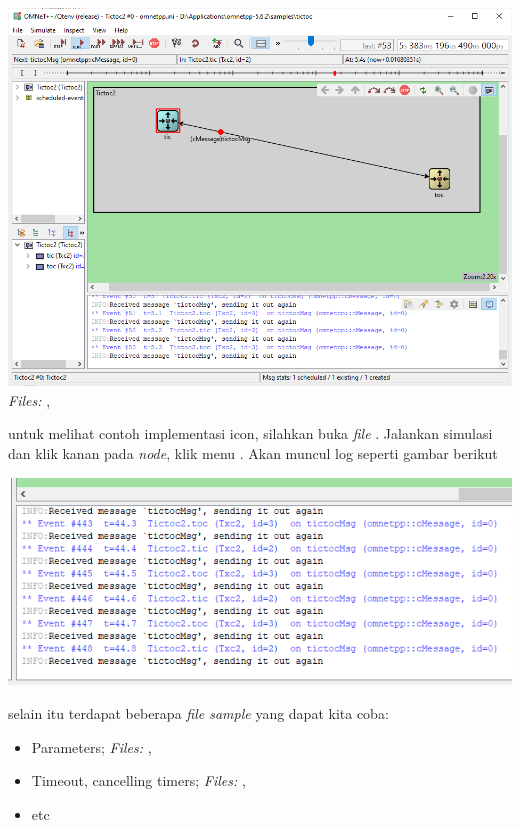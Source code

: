 \documentclass[conference]{IEEEtran}
\begin{document}
\includegraphics[scale=0.25]{images/tictoc2.ned.png}
\textit{Files:} , 


untuk melihat contoh implementasi icon, silahkan buka \textit{file} . Jalankan simulasi dan klik kanan pada \textit{node}, klik menu . Akan muncul log seperti gambar berikut

\includegraphics[scale=0.38]{images/tictoc3-log.ned.png}


selain itu terdapat beberapa \textit{file sample} yang dapat kita coba:
\begin{itemize}
  \item Parameters; \textit{Files: }, 
  \item Timeout, cancelling timers; \textit{Files: }, 
  \item etc
\end{itemize}
\end{document}
